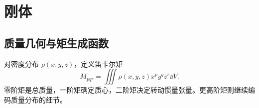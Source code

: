\section{刚体}

\subsection{质量几何与矩生成函数}

对密度分布 $\rho(x,y,z)$，定义笛卡尔矩
\begin{equation}\label{advA1:eq:cartesian-moment}
 M_{pqr}=\iiint \rho(x,y,z)x^py^qz^r\dd V .
\end{equation}
零阶矩是总质量，一阶矩确定质心，二阶矩决定转动惯量张量。更高阶矩则继续编码质量分布的细节。


